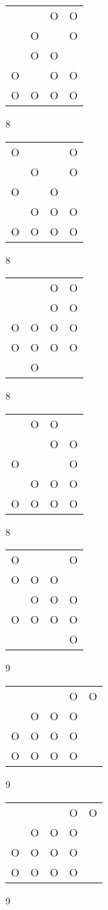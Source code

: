 \begin{tabular}{|m{0.2cm}m{0.2cm}m{0.2cm}m{0.2cm}|}\hline
 & &O&O\\
 &O& &O\\
 &O&O& \\
O& &O&O\\
O&O&O&O\\
\hline\end{tabular}8
\begin{tabular}{|m{0.2cm}m{0.2cm}m{0.2cm}m{0.2cm}|}\hline
O& & &O\\
 &O& &O\\
O& &O& \\
 &O&O&O\\
O&O&O&O\\
\hline\end{tabular}8
\begin{tabular}{|m{0.2cm}m{0.2cm}m{0.2cm}m{0.2cm}|}\hline
 & &O&O\\
 & &O&O\\
O&O&O&O\\
O&O&O&O\\
 &O& & \\
\hline\end{tabular}8
\begin{tabular}{|m{0.2cm}m{0.2cm}m{0.2cm}m{0.2cm}|}\hline
 &O&O& \\
 & &O&O\\
O& & &O\\
 &O&O&O\\
O&O&O&O\\
\hline\end{tabular}8
\begin{tabular}{|m{0.2cm}m{0.2cm}m{0.2cm}m{0.2cm}|}\hline
O& & &O\\
O&O&O& \\
 &O&O&O\\
O&O&O&O\\
 & & &O\\
\hline\end{tabular}9
\begin{tabular}{|m{0.2cm}m{0.2cm}m{0.2cm}m{0.2cm}m{0.2cm}|}\hline
 & & &O&O\\
 &O&O&O& \\
O&O&O&O& \\
O&O&O&O& \\
\hline\end{tabular}9
\begin{tabular}{|m{0.2cm}m{0.2cm}m{0.2cm}m{0.2cm}m{0.2cm}|}\hline
 & & &O&O\\
 &O&O&O& \\
O&O&O&O& \\
O&O&O&O& \\
\hline\end{tabular}9
